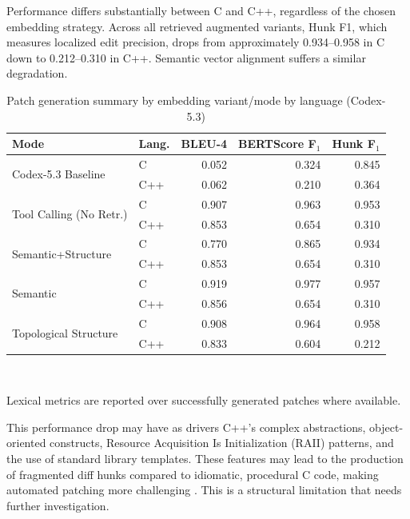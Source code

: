 Performance differs substantially between C and C++, regardless of the chosen embedding strategy.
Across all retrieved augmented variants, Hunk F1, which measures localized edit precision, drops from approximately 0.934–0.958 in C down to 0.212–0.310 in C++. 
Semantic vector alignment suffers a similar degradation.

\begin{table}[H]
  \centering
  \small
  \setlength{\tabcolsep}{4pt} %
  \caption{Patch generation summary by embedding variant/mode by language (Codex-5.3)}
  \label{tab:patch_analysis_summary_by_language_codex}
  \begin{tabular}{llrrr}
    \toprule
    \textbf{Mode} & \textbf{Lang.} & \textbf{BLEU-4} & \makecell{\bfseries BERTScore\\F$_1$} & \makecell{\bfseries Hunk\\F$_1$} \\
    \midrule
    \multirow{2}{*}{Codex-5.3 Baseline}
      & C   & 0.052 & 0.324 & 0.845 \\
      & C++ & 0.062 & 0.210 & 0.364 \\
    \midrule
    \multirow{2}{*}{Tool Calling (No Retr.)}
      & C   & 0.907 & 0.963 & 0.953 \\
      & C++ & 0.853 & 0.654 & 0.310 \\
    \midrule
    \multirow{2}{*}{Semantic+Structure}
      & C   & 0.770 & 0.865 & 0.934 \\
      & C++ & 0.853 & 0.654 & 0.310 \\
    \midrule
    \multirow{2}{*}{Semantic}
      & C   & 0.919 & 0.977 & 0.957 \\
      & C++ & 0.856 & 0.654 & 0.310 \\
    \midrule
    \multirow{2}{*}{Topological Structure}
      & C   & 0.908 & 0.964 & 0.958 \\
      & C++ & 0.833 & 0.604 & 0.212 \\
    \bottomrule
  \end{tabular}
  \\[2pt]
  \begin{minipage}{\linewidth}
  \centering
    \scriptsize Lexical metrics are reported over successfully generated patches where available.
  \end{minipage}
\end{table}

This performance drop may have as drivers C++'s complex abstractions, object-oriented constructs, Resource Acquisition Is Initialization (RAII) patterns, and the use of standard library templates.
These features may lead to the production of fragmented diff hunks compared to idiomatic, procedural C code, making automated patching more challenging \cite{cheng-etal-2026-diff}.
This is a structural limitation that needs further investigation. 

